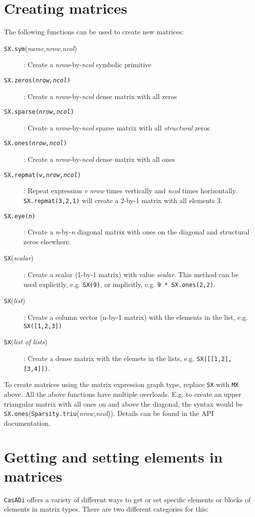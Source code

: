 \documentclass[a4paper,12pt]{book}
\newcommand{\CasADi}{\texttt{CasADi}\xspace}
\begin{document}
\section{Creating matrices}
The following functions can be used to create new matrices:
\begin{description}
  \item[\texttt{SX.sym}(\emph{name,nrow,ncol})]: Create a \emph{nrow}-by-\emph{ncol} symbolic primitive
  \item[\texttt{SX.zeros(\emph{nrow,ncol})}]: Create a \emph{nrow}-by-\emph{ncol} dense matrix with all zeros
  \item[\texttt{SX.sparse(\emph{nrow,ncol})}]: Create a \emph{nrow}-by-\emph{ncol} sparse matrix with all \emph{structural} zeros
  \item[\texttt{SX.ones(\emph{nrow,ncol})}]: Create a \emph{nrow}-by-\emph{ncol} dense matrix with all ones
  \item[\texttt{SX.repmat(\emph{v,nrow,ncol})}]: Repeat expression \emph{v} \emph{nrow} times vertically and \emph{ncol} times horizontally. \verb|SX.repmat(3,2,1)| will create a 2-by-1 matrix with all elements 3.
  \item[\texttt{SX.eye(\emph{n})}]: Create a \emph{n}-by-\emph{n} diagonal matrix with ones on the diagonal and structural zeros elsewhere.
  \item[\texttt{SX}(\emph{scalar})]: Create a scalar (1-by-1 matrix) with value \emph{scalar}. This method can be used explicitly, e.g. \verb|SX(9)|, or implicitly, e.g. \verb|9 * SX.ones(2,2)|.
  \item[\texttt{SX}(\emph{list})]: Create a column vector (n-by-1 matrix) with the elements in the list, e.g. \verb|SX([1,2,3])|
  \item[\texttt{SX}(\emph{list of lists})]: Create a dense matrix with the elemets in the lists, e.g. \verb|SX([[1,2],[3,4]])|.
\end{description}

To create matrices using the matrix expression graph type, replace \texttt{SX} with \texttt{MX} above. All the above functions have multiple overloads. E.g. to create an upper triangular matrix with all ones on and above the diagonal, the syntax would be \texttt{SX.ones}(\texttt{Sparsity.triu}(\emph{nrow,ncol})). Details can be found in the API documentation.

\section{Getting and setting elements in matrices}
\CasADi offers a variety of different ways to get or set specific elements or blocks of elements in matrix types. There are two different categories for this:
\end{document}
